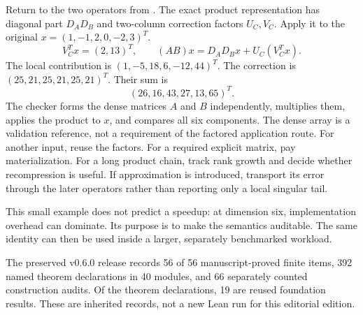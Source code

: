 Return to the two operators from . The exact product representation has diagonal part $D_AD_B$ and two-column correction factors $U_C,V_C$. Apply it to the original $x=(1,-1,2,0,-2,3)^T$.
\[
V_C^Tx=(2,13)^T,\qquad
(AB)x=D_AD_Bx+U_C(V_C^Tx).
\]
The local contribution is $(1,-5,18,6,-12,44)^T$. The correction is $(25,21,25,21,25,21)^T$. Their sum is
\[
(26,16,43,27,13,65)^T.
\]
The checker forms the dense matrices $A$ and $B$ independently, multiplies them, applies the product to $x$, and compares all six components. The dense array is a validation reference, not a requirement of the factored application route.
For another input, reuse the factors. For a required explicit matrix, pay materialization. For a long product chain, track rank growth and decide whether recompression is useful. If approximation is introduced, transport its error through the later operators rather than reporting only a local singular tail.

This small example does not predict a speedup: at dimension six, implementation overhead can dominate. Its purpose is to make the semantics auditable. The same identity can then be used inside a larger, separately benchmarked workload.

The preserved v0.6.0 release records 56 of 56 manuscript-proved finite items, 392 named theorem declarations in 40 modules, and 66 separately counted construction audits. Of the theorem declarations, 19 are reused foundation results. These are inherited records, not a new Lean run for this editorial edition.


